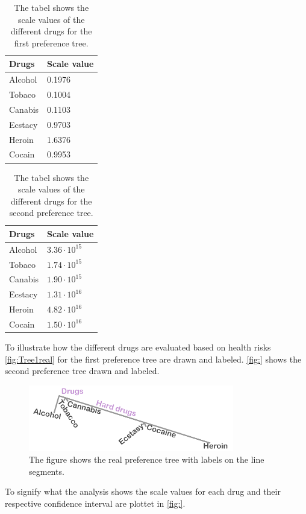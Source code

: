 % 
\begin{table}[H]
	\centering
	\begin{tabular}{@{}ll@{}}
		\toprule
		Drugs     & Scale value \\ \midrule
		Alcohol	  & 0.1976   \\
		Tobaco	  & 0.1004   \\
		Canabis	  & 0.1103   \\
		Ecstacy	  & 0.9703   \\
		Heroin	  & 1.6376   \\
		Cocain	  & 0.9953   \\	\bottomrule
	\end{tabular}
	\caption{The tabel shows the scale values of the different drugs for the first preference tree.}
	\label{tab:ScaleValues1}
\end{table} 
\noindent 
%

\begin{table}[H]
	\centering
	\begin{tabular}{@{}ll@{}}
		\toprule
		Drugs     & Scale value \\ \midrule
		Alcohol	  & $3.36\cdot10^{15}$   \\
		Tobaco	  & $1.74\cdot10^{15}$   \\
		Canabis	  & $1.90\cdot10^{15}$   \\
		Ecstacy	  & $1.31\cdot10^{16}$   \\
		Heroin	  & $4.82\cdot10^{16}$   \\
		Cocain	  & $1.50\cdot10^{16}$   \\	\bottomrule
	\end{tabular}
	\caption{The tabel shows the scale values of the different drugs for the second preference tree.}
	\label{tab:ScaleValues2}
\end{table} 
\noindent 
%
To illustrate how the different drugs are evaluated based on health risks \autoref{fig:Tree1real} for the first preference tree are drawn and labeled. \autoref{fig:} shows the second preference tree drawn and labeled. 
%
\begin{figure}[H]
\centering
\includegraphics[width = 0.80\textwidth]{Figure/Tree1real}
\caption{The figure shows the real preference tree with labels on the line segments.}
\label{fig:Tree1real}
\end{figure}
\noindent
%
To signify what the analysis shows the scale values for each drug and their respective confidence interval are plottet in \autoref{fig:}.

